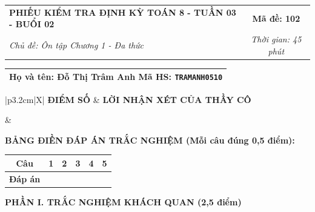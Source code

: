 \documentclass[12pt,a4paper]{article}
\begin{document}
\newpage


\noindent
\begin{tabularx}{\linewidth}{|X|c|}
\hline
\textbf{PHIẾU KIỂM TRA ĐỊNH KỲ TOÁN 8 - TUẦN 03 - BUỔI 02} & \textbf{Mã đề: 102} \\
\textit{Chủ đề: Ôn tập Chương 1 - Đa thức} & \textit{Thời gian: 45 phút} \\
\hline
\end{tabularx}

\vspace{1mm}

\noindent
\begin{tabularx}{\linewidth}{|X|}
\hline
\rule[-2mm]{0pt}{7.5mm}\textbf{Họ và tên:} \textbf{\large Đỗ Thị Trâm Anh} \hfill \textbf{Mã HS:} \texttt{TRAMANH0510} \quad \\
\hline
\end{tabularx}

\vspace{1mm}

\noindent
\begin{tabularx}{\linewidth}{|p{3.2cm}|X|}
\hline
\centering\textbf{ĐIỂM SỐ} & \centering\textbf{LỜI NHẬN XÉT CỦA THẦY CÔ} \tabularnewline
\hline
\rule{0pt}{1.3cm} & \tabularnewline
\hline
\end{tabularx}

\vspace{1.2mm}

\noindent\textbf{BẢNG ĐIỀN ĐÁP ÁN TRẮC NGHIỆM (Mỗi câu đúng 0,5 điểm):}
\vspace{0.8mm}

\noindent
\renewcommand{\arraystretch}{1.35}
\begin{tabularx}{\linewidth}{|c|*{5}{>{\centering\arraybackslash}X|}}
\hline
\textbf{Câu} & \textbf{1} & \textbf{2} & \textbf{3} & \textbf{4} & \textbf{5} \\
\hline
\textbf{Đáp án} & & & & & \\
\hline
\end{tabularx}
\renewcommand{\arraystretch}{1.0}

\vspace{1.5mm}

\noindent\textbf{\large PHẦN I. TRẮC NGHIỆM KHÁCH QUAN (2,5 điểm)}
\vspace{1mm}
\end{document}
